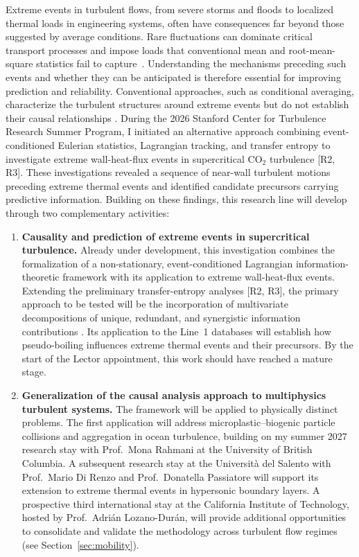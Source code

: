 \documentclass[11pt]{article}
\begin{document}
Extreme events in turbulent flows, from severe storms and floods to localized thermal loads in engineering systems, often have consequences far beyond those suggested by average conditions.
Rare fluctuations can dominate critical transport processes and impose loads that conventional mean and root-mean-square statistics fail to capture~\cite{Guerrero2020}.
Understanding the mechanisms preceding such events and whether they can be anticipated is therefore essential for improving prediction and reliability.
Conventional approaches, such as conditional averaging, characterize the turbulent structures around extreme events but do not establish their causal relationships \cite{Hack2021,Zhang2023}.
During the 2026 Stanford Center for Turbulence Research Summer Program, I initiated an alternative approach combining event-conditioned Eulerian statistics, Lagrangian tracking, and transfer entropy to investigate extreme wall-heat-flux events in supercritical CO$_2$ turbulence [R2, R3].
These investigations revealed a sequence of near-wall turbulent motions preceding extreme thermal events and identified candidate precursors carrying predictive information.
Building on these findings, this research line will develop through two complementary activities:
\begin{enumerate}
	\item \textbf{Causality and prediction of extreme events in supercritical turbulence.}
	Already under development, this investigation combines the formalization of a non-stationary, event-conditioned Lagrangian information-theoretic framework with its application to extreme wall-heat-flux events.
	Extending the preliminary transfer-entropy analyses [R2, R3], the primary approach to be tested will be the incorporation of multivariate decompositions of unique, redundant, and synergistic information contributions \cite{MartinezSanchez2024}.
	Its application to the Line~1 databases will establish how pseudo-boiling influences extreme thermal events and their precursors.
	By the start of the Lector appointment, this work should have reached a mature stage.
	
	\item \textbf{Generalization of the causal analysis approach to multiphysics turbulent systems.}
	The framework will be applied to physically distinct problems.
	The first application will address microplastic--biogenic particle collisions and aggregation in ocean turbulence, building on my summer 2027 research stay with Prof.~Mona Rahmani at the University of British Columbia.
	A subsequent research stay at the Universit\`a del Salento with Prof.~Mario Di Renzo and Prof.~Donatella Passiatore will support its extension to extreme thermal events in hypersonic boundary layers.
	A prospective third international stay at the California Institute of Technology, hosted by Prof.~Adrián Lozano-Durán, will provide additional opportunities to consolidate and validate the methodology across turbulent flow regimes (see Section~\ref{sec:mobility}).
\end{enumerate}
\end{document}
